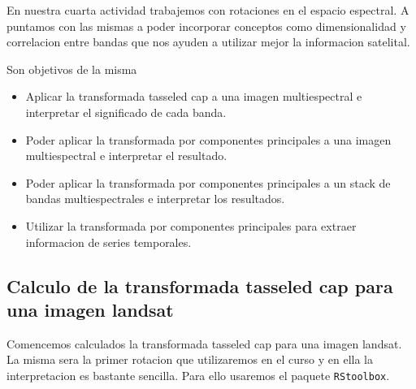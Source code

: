 En nuestra cuarta actividad trabajemos con rotaciones en el espacio espectral. A
puntamos con las mismas a poder incorporar conceptos como dimensionalidad y
correlacion entre bandas que nos ayuden a utilizar mejor la informacion
satelital.

Son objetivos de la misma

\begin{itemize}
    \item Aplicar la transformada tasseled cap a una imagen multiespectral e
        interpretar el significado de cada banda.
    \item Poder aplicar la transformada por componentes principales a una imagen
        multiespectral e interpretar el resultado.
    \item Poder aplicar la transformada por componentes principales a un stack
        de bandas multiespectrales e interpretar los resultados.
    \item Utilizar la transformada por componentes principales para extraer
        informacion de series temporales.
\end{itemize}

\subsection{Calculo de la transformada tasseled cap para una imagen landsat}

Comencemos calculados la transformada tasseled cap para una imagen landsat. La
misma sera la primer rotacion que utilizaremos en el curso y en ella la
interpretacion es bastante sencilla. Para ello usaremos el paquete
\texttt{RStoolbox}.

